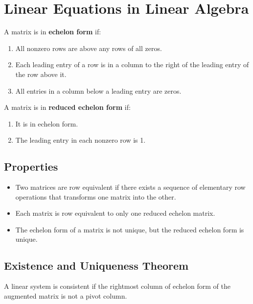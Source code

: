 \documentclass{article}
\begin{document}
\setlength{\parindent}{0pt}

\section*{Linear Equations in Linear Algebra}

A matrix is in \textbf{echelon form} if:
\begin{enumerate}
    \item All nonzero rows are above any rows of all zeros.
    \item Each leading entry of a row is in a column to the right of the leading entry of the row
    above it.
    \item All entries in a column below a leading entry are zeros.
\end{enumerate}

\noindent
A matrix is in \textbf{reduced echelon form} if:
\begin{enumerate}
    \item It is in echelon form.
    \item The leading entry in each nonzero row is 1.
\end{enumerate}

\subsection*{Properties}
\begin{itemize}
    \item Two matrices are row equivalent if there exists a sequence of elementary row operations
    that transforms one matrix into the other.
    \item Each matrix is row equivalent to only one reduced echelon matrix.
    \item The echelon form of a matrix is not unique, but the reduced echelon form is unique.
\end{itemize}

\subsection*{Existence and Uniqueness Theorem}
A linear system is consistent if the rightmost column of echelon form of the augmented matrix is
not a pivot column.
\end{document}
